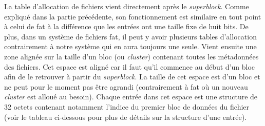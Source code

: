 \begin{center}
    \label{tab:fs:struct:superblock}
\end{center}

La table d'allocation de fichiers vient directement après le \textit{superblock}.
Comme expliqué dans la partie précédente, son fonctionnement est similaire en tout
point à celui de \acrshort{fat} à la différence que les entrées ont une taille fixe
de huit bits. De plus, dans un système de fichiers \acrshort{fat}, il peut y avoir
plusieurs tables d'allocation contrairement à notre système qui en aura toujours
une seule. Vient ensuite une zone alignée sur la taille d'un bloc (ou \textit{cluster})
contenant toutes les métadonnées des fichiers. Cet espace est aligné car il faut
qu'il commence au début d'un bloc afin de le retrouver à partir du \textit{superblock}.
La taille de cet espace est d'un bloc et ne peut pour le moment pas être agrandi
(contrairement à \acrshort{fat} où un nouveau \textit{cluster} est alloué au besoin).
Chaque entrée dans cet espace est une structure de 32 octets contenant notamment
l'indice du premier bloc de données du fichier (voir le tableau ci-dessous pour
plus de détails sur la structure d'une entrée).

\begin{center}
    \label{tab:fs:struct:entry}
\end{center}

